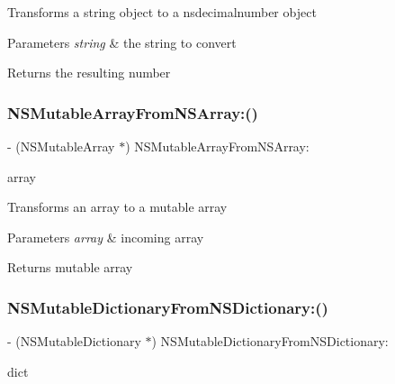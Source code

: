 Transforms a string object to a nsdecimalnumber object 
\begin{DoxyParams}{Parameters}
{\em string} & the string to convert \\
\hline
\end{DoxyParams}
\begin{DoxyReturn}{Returns}
the resulting number 
\end{DoxyReturn}
\mbox{\label{interface_o_p_t_l_y_j_s_o_n_value_transformer_afb4db61bf86ffd4ab520bb9454ebdcc9}} 
\subsubsection{\texorpdfstring{N\+S\+Mutable\+Array\+From\+N\+S\+Array\+:()}{NSMutableArrayFromNSArray:()}}
{\footnotesize\ttfamily -\/ (N\+S\+Mutable\+Array $\ast$) N\+S\+Mutable\+Array\+From\+N\+S\+Array\+: \begin{DoxyParamCaption}\item[{(N\+S\+Array $\ast$)}]{array }\end{DoxyParamCaption}}

Transforms an array to a mutable array 
\begin{DoxyParams}{Parameters}
{\em array} & incoming array \\
\hline
\end{DoxyParams}
\begin{DoxyReturn}{Returns}
mutable array 
\end{DoxyReturn}
\mbox{\label{interface_o_p_t_l_y_j_s_o_n_value_transformer_a18dddf642783cee07d55379c9b37eaf4}} 
\subsubsection{\texorpdfstring{N\+S\+Mutable\+Dictionary\+From\+N\+S\+Dictionary\+:()}{NSMutableDictionaryFromNSDictionary:()}}
{\footnotesize\ttfamily -\/ (N\+S\+Mutable\+Dictionary $\ast$) N\+S\+Mutable\+Dictionary\+From\+N\+S\+Dictionary\+: \begin{DoxyParamCaption}\item[{(N\+S\+Dictionary $\ast$)}]{dict }\end{DoxyParamCaption}}

